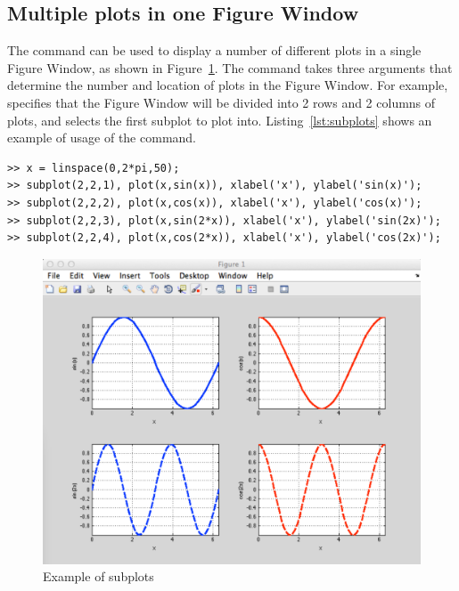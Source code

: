 \subsection{Multiple plots in one Figure Window}
The  command can be used to display a number of different plots in a single Figure Window, as shown in Figure~\ref{fig:subplots}. The  command takes three arguments that determine the number and location of plots in the Figure Window. For example,  specifies that the Figure Window will be divided into 2 rows and 2 columns of plots, and selects the first subplot to plot into. Listing~\ref{lst:subplots} shows an example of usage of the  command.
\begin{lstlisting}[caption={Using the \mcode{subplot} command},label=lst:subplots]
>> x = linspace(0,2*pi,50);
>> subplot(2,2,1), plot(x,sin(x)), xlabel('x'), ylabel('sin(x)');
>> subplot(2,2,2), plot(x,cos(x)), xlabel('x'), ylabel('cos(x)');
>> subplot(2,2,3), plot(x,sin(2*x)), xlabel('x'), ylabel('sin(2x)');
>> subplot(2,2,4), plot(x,cos(2*x)), xlabel('x'), ylabel('cos(2x)');
\end{lstlisting}
\begin{figure}[h]
	\myfloatalign
	\includegraphics[width=0.9\linewidth]{Graphics/Unit02/subplots}
	\caption{Example of subplots}
	\label{fig:subplots}
\end{figure}

